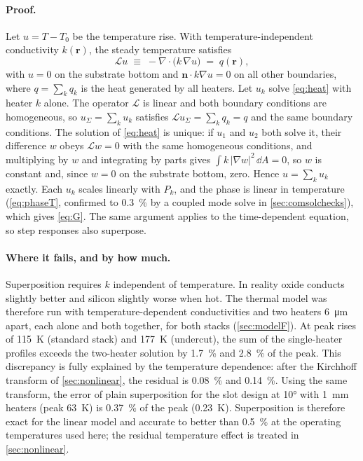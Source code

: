 \paragraph{Proof.} Let $u=T-T_0$ be the temperature rise. With temperature-independent conductivity $k(\bm r)$,
the steady temperature satisfies
\begin{equation}
  \mathcal L u \;\equiv\; -\nabla\!\cdot\!\bigl(k\,\nabla u\bigr) \;=\; q(\bm r),
  \label{eq:heat}
\end{equation}
with $u=0$ on the substrate bottom and $\bm n\cdot k\nabla u=0$ on all other boundaries,
where $q=\sum_k q_k$ is the heat generated by all heaters. Let $u_k$ solve \cref{eq:heat} with heater $k$ alone.
The operator $\mathcal L$ is linear and both boundary conditions are homogeneous, so $u_\Sigma=\sum_k u_k$ satisfies
$\mathcal L u_\Sigma=\sum_k q_k=q$ and the same boundary conditions. The solution of \cref{eq:heat} is unique: if
$u_1$ and $u_2$ both solve it, their difference $w$ obeys $\mathcal Lw=0$ with the same homogeneous conditions, and
multiplying by $w$ and integrating by parts gives $\int k\,|\nabla w|^2\,\dd A=0$, so $w$ is constant and, since
$w=0$ on the substrate bottom, zero. Hence $u=\sum_k u_k$ exactly. Each $u_k$ scales linearly with $P_k$, and the
phase is linear in temperature (\cref{eq:phaseT}, confirmed to \qty{0.3}{\percent} by a coupled mode solve in
\cref{sec:comsolchecks}), which gives \cref{eq:G}. The same argument applies to the time-dependent equation, so
step responses also superpose.

\paragraph{Where it fails, and by how much.} Superposition requires $k$ independent of temperature. In reality
oxide conducts slightly better and silicon slightly worse when hot. The thermal model was therefore run with
temperature-dependent conductivities and two heaters \qty{6}{\micro\metre} apart, each alone and both together,
for both stacks (\cref{sec:modelF}). At peak rises of \qty{115}{\kelvin} (standard stack) and \qty{177}{\kelvin}
(undercut), the sum of the single-heater profiles exceeds the two-heater solution by \qty{1.7}{\percent} and
\qty{2.8}{\percent} of the peak. This discrepancy is fully explained by the temperature dependence: after the
Kirchhoff transform of \cref{sec:nonlinear}, the residual is \qty{0.08}{\percent} and \qty{0.14}{\percent}. Using
the same transform, the error of plain superposition for the slot design at \ang{10} with \qty{1}{\milli\metre}
heaters (peak \qty{63}{\kelvin}) is \qty{0.37}{\percent} of the peak (\qty{0.23}{\kelvin}). Superposition is
therefore exact for the linear model and accurate to better than \qty{0.5}{\percent} at the operating
temperatures used here; the residual temperature effect is treated in \cref{sec:nonlinear}.

